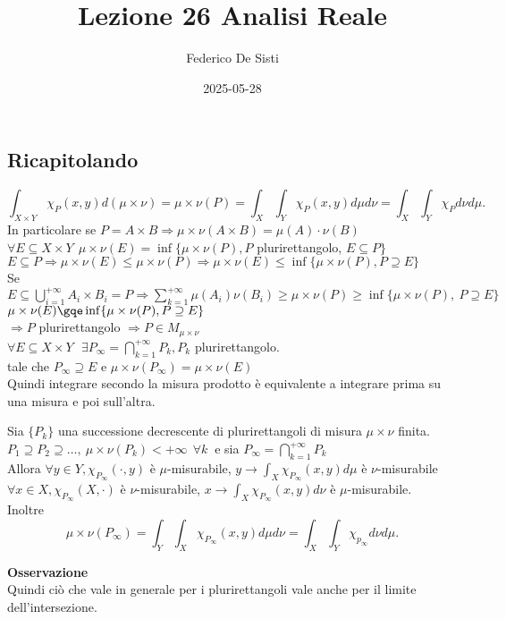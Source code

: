 \documentclass[12px]{article}
\title{Lezione 26 Analisi Reale}
\date{2025-05-28}
\author{Federico De Sisti}
\begin{document}
	\maketitle
	\newpage
	\subsection{Ricapitolando}
	\[
		\int_{X\times Y} \chi_P(x,y)d(\mu\times\nu) =\mu\times\nu(P) = \int_X\int_Y\chi_P(x,y)d\mu d\nu = \int_X\int_Y\chi_P d\nu d\mu
	.\] 
	In particolare se $P = A\times B \Rightarrow  \mu\times\nu(A\times B) = \mu(A)\cdot \nu(B)$ \\
	$\forall E \subseteq X\times Y\ \ \mu\times\nu(E) = \inf\{\mu\times\nu(P), P$ plurirettangolo,  $E\subseteq P\}$ \\
	$E\subseteq P \Rightarrow \mu\times\nu (E) \leq \mu\times\nu (P) \Rightarrow \mu\times\nu(E)\leq\inf\{\mu\times\nu(P), P\supseteq E\}$ \\
	Se $\displaystyle E\subseteq \bigcup^{+\infty}_{i=1}A_i\times B_i = P \Rightarrow  \sum^{+\infty}_{k=1}\mu(A_i)\nu(B_i)\geq  \mu\times\nu(P) \geq \inf\{\mu\times\nu(P), \ P\supseteq E\}$ \\
	$\mu\times\nu(E)\gqe \inf\{\mu\times\nu(P), P\supseteq E\}$\\
	$ \Rightarrow  P$ plurirettangolo $ \Rightarrow  P\in M_{\mu\times\nu}$ \\
	$\forall E\subseteq X\times Y\ \ \ \exists P_\infty = \bigcap^{+\infty}_{k=1}P_k, P_k$ plurirettangolo.\\
	tale che $P_\infty\supseteq E$ e  $\mu\times\nu(P_\infty) =\mu\times\nu(E)$ \\
	Quindi integrare secondo la misura prodotto è equivalente a integrare prima su una misura e poi sull'altra.\\
\begin{lemm}
	Sia $\{P_k\}$ una successione decrescente di plurirettangoli di misura  $\mu\times\nu$ finita.\\
	 $P_1\supseteq P_2\supseteq\ldots, \ \mu\times\nu(P_k) < +\infty\ \ \forall k\ $  e sia $P_\infty = \bigcap^{+\infty}_{k=1}P_k$\\
	 Allora $\forall y\in Y, \chi_{P_\infty}(\cdot, y)$ è $\mu$-misurabile,  $y \rightarrow \int_X \chi_{P_\infty}(x,y)d\mu$ è $\nu$-misurabile \\
	 $\forall x\in X, \chi_{P_\infty}(X,\cdot)$ è  $\nu$-misurabile, $x \rightarrow \int_X\chi_{P_\infty} (x,y)d\nu$ è $\mu$-misurabile.\\
	 Inoltre
	 \[
		 \mu\times\nu(P_\infty) = \int_Y\int_X\chi_{P_\infty}(x,y)d\mu d\nu = \int_X\int_Y \chi_{p_\infty}d\nu d\mu
	 .\] 
\end{lemm}
\textbf{Osservazione}\\
Quindi ciò che vale in generale per i plurirettangoli vale anche per il limite dell'intersezione.\\
\end{document}
